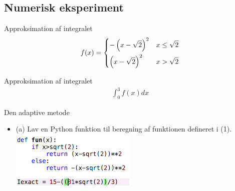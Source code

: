 %    
\subsection{Numerisk eksperiment}
\begin{frame}{Approksimation af integralet}
\begin{align*}
f(x) = 
\begin{dcases}
- \left( x - \sqrt{2} \right)^2 & x \leq \sqrt{2}\\
\left( x - \sqrt{2} \right)^2 & x > \sqrt{2} \\
\end{dcases}
\end{align*} 
    
    Approksimation af integralet 
    \begin{align}
    \int_{0}^{3}f(x)dx    
    \end{align}
\end{frame}



\begin{frame}{Den adaptive metode}
    \begin{itemize}
        \item (a) Lav en Python funktion til beregning af funktionen defineret i (1).
        \includegraphics[]{images/1.4(a).png}
    \end{itemize}
\end{frame}


